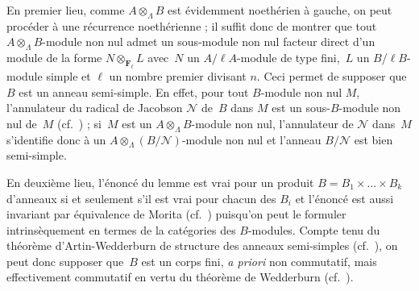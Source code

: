 \documentclass[10pt]{../fichiers-configuration-latex/smfart}
\begin{document}
En premier lieu, comme $A\otimes_\Lambda B$ est évidemment noethérien à
gauche, on peut procéder à une récurrence noethérienne ; il suffit donc de
montrer que tout $A\otimes_\Lambda B$-module non nul admet un sous-module
non nul facteur direct d'un module de la forme $N\otimes_{\mathbf{F}_\ell}
L$ avec $N$ un $A/\ell A$-module de type fini, $L$ un $B/\ell B$-module
simple et $\ell$ un nombre premier divisant $n$. Ceci permet de supposer
que $B$ est un anneau semi-simple. En effet, pour tout $B$-module non nul
$M$, l'annulateur du radical de Jacobson $\mathscr N$ de $B$ dans $M$
est un sous-$B$-module non nul de $M$ (cf.~\cite[§4]{GTM131@Lam}) ;
si $M$ est un $A\otimes_{\Lambda} B$-module non nul, l'annulateur de
$\mathscr N$ dans $M$ s'identifie donc à un $A\otimes_{\Lambda}(B/\mathscr
N)$-module non nul et l'anneau $B/\mathscr N$ est bien semi-simple.

En deuxième lieu, l'énoncé du lemme est vrai pour un produit
$B=B_1\times\dots\times B_k$ d'anneaux si et seulement s'il est vrai pour
chacun des $B_i$ et l'énoncé est aussi invariant par équivalence de Morita
(cf.~\cite[§18]{GTM189@Lam}) puisqu'on peut le formuler intrinsèquement
en termes de la catégories des $B$-modules. Compte tenu du théorème
d'Artin-Wedderburn de structure des anneaux semi-simples
(cf.~\cite[3.5]{GTM131@Lam}), on peut donc supposer que $B$ est un
corps fini, \emph{a priori} non commutatif, mais effectivement commutatif
en vertu du théorème de Wedderburn (cf.~\cite[13.1]{GTM131@Lam}).
\end{document}
